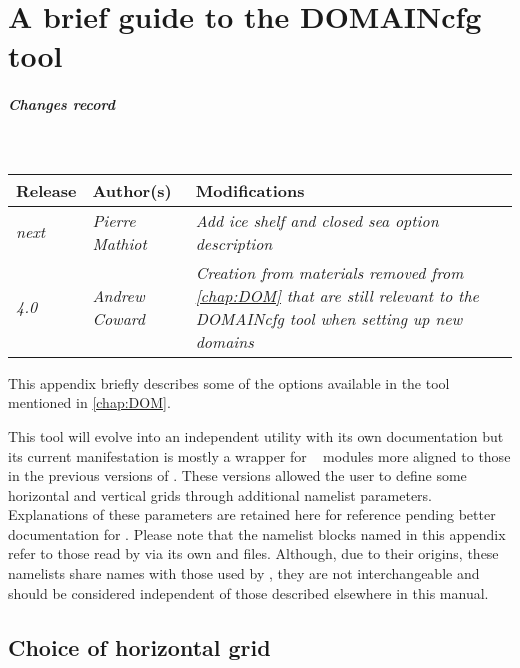 \documentclass[../main/NEMO_manual]{subfiles}
\begin{document}
\chapter{A brief guide to the DOMAINcfg tool}
\label{apdx:DOMCFG}

\chaptertoc

\paragraph{Changes record} ~\\

{\footnotesize
  \begin{tabularx}{\textwidth}{l||X|X}
    Release     & Author(s)            & Modifications                                                 \\
    \hline
    {\em  next} & {\em Pierre Mathiot} & {\em Add ice shelf and closed sea option description        } \\
    {\em   4.0} & {\em  Andrew Coward} & {\em Creation from materials removed from \autoref{chap:DOM}
                                              that are still relevant to the DOMAINcfg tool
                                              when setting up new domains                            }
  \end{tabularx}
}

\clearpage

This appendix briefly describes some of the options available in the
 tool mentioned in \autoref{chap:DOM}.

This tool will evolve into an independent utility with its own documentation but its
current manifestation is mostly a wrapper for \NEMO\  modules more aligned to
those in the previous versions of \NEMO. These versions allowed the user to define some
horizontal and vertical grids through additional namelist parameters. Explanations of
these parameters are retained here for reference pending better documentation for
. Please note that the namelist blocks named in this appendix refer to
those read by  via its own  and
 files. Although, due to their origins, these namelists share names
with those used by \NEMO, they are not interchangeable and should be considered independent
of those described elsewhere in this manual.

\section{Choice of horizontal grid}
\label{sec:DOMCFG_hor}
\end{document}
